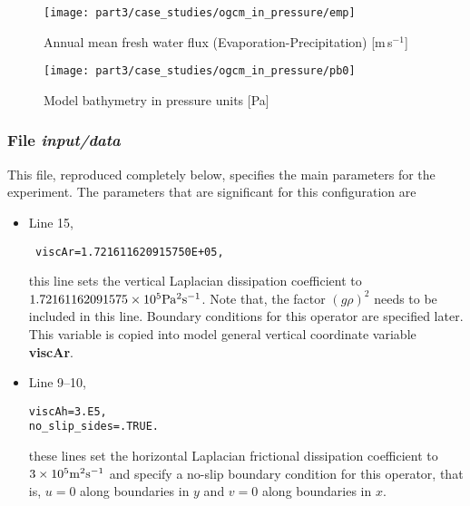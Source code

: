 {\begin{figure}[t]
  \begin{center}
    \texttt{[image: part3/case\_studies/ogcm\_in\_pressure/emp]}
    \caption{Annual mean fresh water flux (Evaporation-Precipitation) [m\,s$^{-1}$]}
    \label{FIG:sim_config_empmr_pcoord}
  \end{center}
\end{figure}
\begin{figure}[t]
  \begin{center}
    \texttt{[image: part3/case\_studies/ogcm\_in\_pressure/pb0]}
    \caption{Model bathymetry in pressure units [Pa]}
    \label{FIG:model_bathymetry_pcoord}
  \end{center}
\end{figure}

\subsubsection{File {\it input/data}}
\label{www:tutorials}

This file, reproduced completely below, specifies the main parameters 
for the experiment. The parameters that are significant for this configuration
are

\begin{itemize}

\item Line 15, 
\begin{verbatim} viscAr=1.721611620915750E+05, \end{verbatim}
this line sets the vertical Laplacian dissipation coefficient to
$1.72161162091575 \times 10^{5} {\rm Pa^{2}s^{-1}}$. Note that, the factor
$(g\rho)^2$ needs to be included in this line. Boundary conditions
for this operator are specified later. This variable is copied into
model general vertical coordinate variable {\bf viscAr}.


\item Line 9--10, 
\begin{verbatim}
viscAh=3.E5,
no_slip_sides=.TRUE.
\end{verbatim} 
  these lines set the horizontal Laplacian frictional dissipation
  coefficient to $3 \times 10^{5} {\rm m^{2}s^{-1}}$ and specify a
  no-slip boundary condition for this operator, that is, $u=0$ along
  boundaries in $y$ and $v=0$ along boundaries in $x$.


\end{itemize}}
